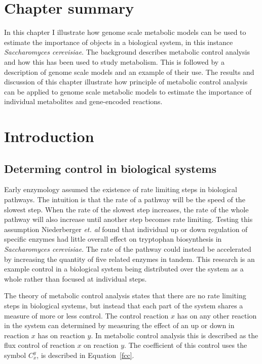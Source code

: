\section*{Chapter summary}

In this chapter I illustrate how genome scale metabolic models can be used to estimate the importance of objects in a biological system, in this instance \emph{Saccharomyces cerevisiae}. The background describes metabolic control analysis and how this has been used to study metabolism. This is followed by a description of genome scale models and an example of their use. The results and discussion of this chapter illustrate how principle of metabolic control analysis can be applied to genome scale metabolic models to estimate the importance of individual metabolites and gene-encoded reactions.

\clearpage

\section{Introduction}

\subsection{Determing control in biological systems}

Early enzymology assumed the existence of rate limiting steps in biological pathways. The intuition is that the rate of a pathway will be the speed of the slowest step. When the rate of the slowest step increases, the rate of the whole pathway will also increase until another step becomes rate limiting. Testing this assumption Niederberger \emph{et. al} \cite{niederberger1992} found that individual up or down regulation of specific enzymes had little overall effect on tryptophan biosynthesis in \emph{Saccharomyces cerevisiae}. The rate of the pathway could instead be accelerated by increasing the quantity of five related enzymes in tandem. This research is an example control in a biological system being distributed over the system as a whole rather than focused at individual steps.

The theory of metabolic control analysis \cite{fell1992,fell1997} states that there are no rate limiting steps in biological systems, but instead that each part of the system shares a measure of more or less control. The control reaction $x$ has on any other reaction in the system can determined by measuring the effect of an up or down in reaction $x$ has on reaction $y$. In metabolic control analysis this is described as the flux control of reaction $x$ on reaction $y$. The coefficient of this control uses the symbol $C_{x}^{y}$, is described in Equation~\vref{fcc}.

